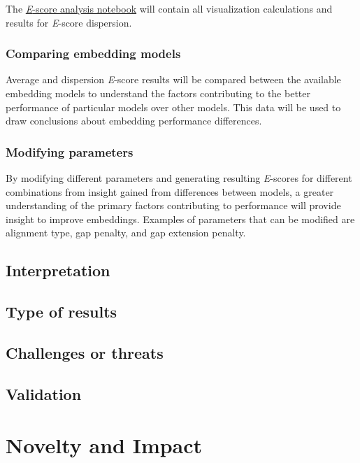 \documentclass[
	letterpaper, %
	10pt, %
]{journalArticle}
\begin{document}
The \href{https://github.com/rgavigan/e-score}{\textit{E}-score analysis notebook} will contain all visualization calculations and results for \textit{E}-score dispersion.

\subsubsection{Comparing embedding models}

Average and dispersion \textit{E}-score results will be compared between the available embedding models to understand the factors contributing to the better performance of particular models over other models. This data will be used to draw conclusions about embedding performance differences.

\subsubsection{Modifying parameters}

By modifying different parameters and generating resulting \textit{E}-scores for different combinations from insight gained from differences between models, a greater understanding of the primary factors contributing to performance will provide insight to improve embeddings. Examples of parameters that can be modified are alignment type, gap penalty, and gap extension penalty.

\subsection{Interpretation}

\subsection{Type of results}

\subsection{Challenges or threats}

\subsection{Validation}

\section{Novelty and Impact}
\end{document}
